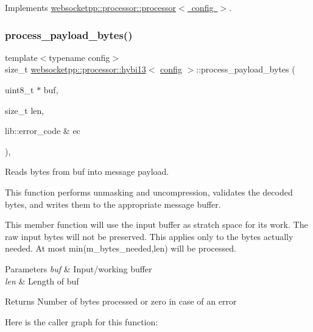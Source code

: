 Implements \mbox{\hyperlink{classwebsocketpp_1_1processor_1_1processor_a64caf3ebac5333112f48eec496ec2a47}{websocketpp\+::processor\+::processor$<$ config $>$}}.

\mbox{\label{classwebsocketpp_1_1processor_1_1hybi13_aa7eece3f48840535f41b625061fa7867}} 
\subsubsection{\texorpdfstring{process\+\_\+payload\+\_\+bytes()}{process\_payload\_bytes()}}
{\footnotesize\ttfamily template$<$typename config$>$ \\
size\+\_\+t \mbox{\hyperlink{classwebsocketpp_1_1processor_1_1hybi13}{websocketpp\+::processor\+::hybi13}}$<$ \mbox{\hyperlink{classconfig}{config}} $>$\+::process\+\_\+payload\+\_\+bytes (\begin{DoxyParamCaption}\item[{uint8\+\_\+t $\ast$}]{buf,  }\item[{size\+\_\+t}]{len,  }\item[{lib\+::error\+\_\+code \&}]{ec }\end{DoxyParamCaption})\hspace{0.3cm}{\ttfamily [inline]}, {\ttfamily [protected]}}



Reads bytes from buf into message payload. 

This function performs unmasking and uncompression, validates the decoded bytes, and writes them to the appropriate message buffer.

This member function will use the input buffer as stratch space for its work. The raw input bytes will not be preserved. This applies only to the bytes actually needed. At most min(m\+\_\+bytes\+\_\+needed,len) will be processed.


\begin{DoxyParams}{Parameters}
{\em buf} & Input/working buffer \\
\hline
{\em len} & Length of buf \\
\hline
\end{DoxyParams}
\begin{DoxyReturn}{Returns}
Number of bytes processed or zero in case of an error 
\end{DoxyReturn}
Here is the caller graph for this function\+:
\mbox{\label{classwebsocketpp_1_1processor_1_1hybi13_af17a224a602ebcda5e481d8c249cf37c}} 
